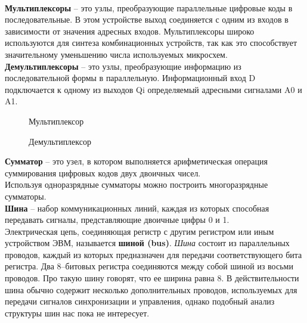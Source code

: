 \\\textbf{Мультиплексоры} -- это узлы, преобразующие параллельные цифровые коды в последовательные. В этом устройстве выход соединяется с одним из входов в зависимости от значения адресных входов. Мультиплексоры широко используются для синтеза комбинационных устройств, так как это способствует значительному уменьшению числа используемых микросхем.
\\\textbf{Демультиплексоры} -- это узлы, преобразующие информацию из последовательной формы в параллельную. Информационный вход D подключается к одному из выходов Qi определяемый адресными сигналами A0 и A1.
\begin{figure}[!h]
\begin{minipage}[c]{6cm}
\center{\texttt{[image: 10\_4]}}
\caption{Мультиплексор}
\end{minipage}
\hfill
\begin{minipage}[c]{6cm}
\center{\texttt{[image: 10\_5]}}
\caption{Демультиплексор}
\end{minipage}
\end{figure}

\textbf{Сумматор} -- это узел, в котором выполняется арифметическая операция суммирования цифровых кодов двух двоичных чисел.
\\Используя одноразрядные сумматоры можно построить многоразрядные сумматоры.
\\\textbf{Шина} -- набор коммуникационных линий, каждая из которых способная передавать сигналы, представляющие двоичные цифры 0 и 1. 
\\Электрическая цепь, соединяющая регистр с другим регистром или иным устройством ЭВМ, называется \textbf{шиной (bus)}. \emph{Шина} состоит из параллельных проводов, каждый из которых предназначен для передачи соответствующего бита регистра. Два 8--битовых регистра соединяются между собой шиной из восьми проводов. Про такую шину говорят, что ее ширина равна 8. В действительности шина обычно содержит несколько дополнительных проводов, используемых для передачи сигналов синхронизации и управления, однако подобный анализ структуры шин нас пока не интересует.
